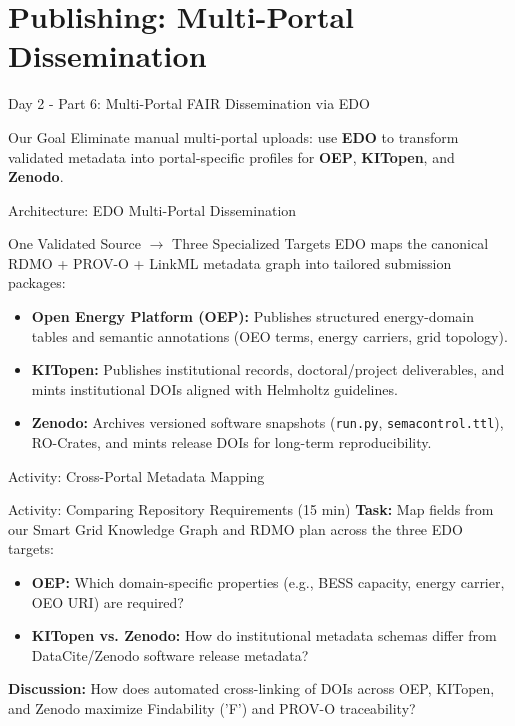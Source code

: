 \documentclass[aspectratio=169]{beamer}
\let\pause\relax
\begin{document}
\section{Publishing: Multi-Portal Dissemination}

\begin{frame}{Day 2 - Part 6: Multi-Portal FAIR Dissemination via EDO}
    \begin{block}{Our Goal}
        Eliminate manual multi-portal uploads: use \textbf{EDO} to transform validated metadata into portal-specific profiles for \textbf{OEP}, \textbf{KITopen}, and \textbf{Zenodo}.
    \end{block}
\end{frame}

\begin{frame}{Architecture: EDO Multi-Portal Dissemination}
    \begin{block}{One Validated Source $\rightarrow$ Three Specialized Targets}
        EDO maps the canonical RDMO + PROV-O + LinkML metadata graph into tailored submission packages:
    \end{block}
    \begin{itemize}
        \item \textbf{Open Energy Platform (OEP):} Publishes structured energy-domain tables and semantic annotations (OEO terms, energy carriers, grid topology).
        \item \textbf{KITopen:} Publishes institutional records, doctoral/project deliverables, and mints institutional DOIs aligned with Helmholtz guidelines.
        \item \textbf{Zenodo:} Archives versioned software snapshots (\texttt{run.py}, \texttt{semacontrol.ttl}), RO-Crates, and mints release DOIs for long-term reproducibility.
    \end{itemize}
\end{frame}

\begin{frame}{Activity: Cross-Portal Metadata Mapping}
    \begin{block}{Activity: Comparing Repository Requirements (15 min)}
        \textbf{Task:} Map fields from our Smart Grid Knowledge Graph and RDMO plan across the three EDO targets:
        \begin{itemize}
            \item \textbf{OEP:} Which domain-specific properties (e.g., BESS capacity, energy carrier, OEO URI) are required?
            \item \textbf{KITopen vs. Zenodo:} How do institutional metadata schemas differ from DataCite/Zenodo software release metadata?
        \end{itemize}
        \pause
        \textbf{Discussion:} How does automated cross-linking of DOIs across OEP, KITopen, and Zenodo maximize Findability ('F') and PROV-O traceability?
    \end{block}
\end{frame}
\end{document}
